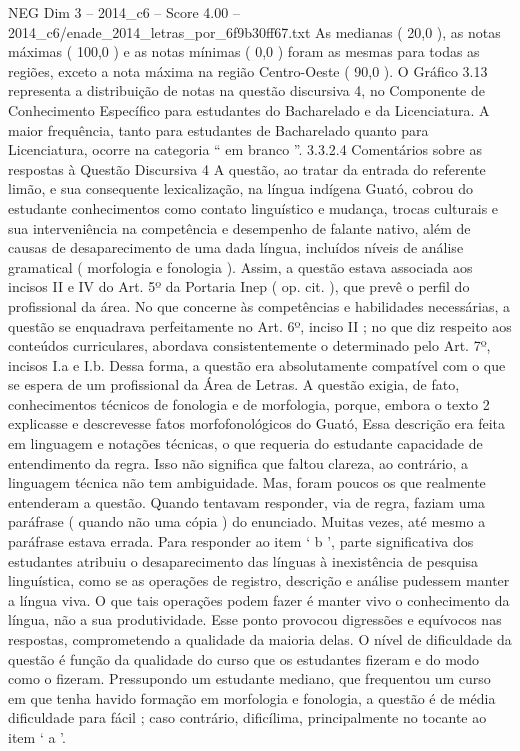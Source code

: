 \begin{textsample}{NEG Dim 3 – 2014\_c6 – Score 4.00 – 2014\_c6/enade\_2014\_letras\_por\_6f9b30ff67.txt}
As medianas ( 20,0 ), as notas máximas ( 100,0 ) e as notas mínimas ( 0,0 ) foram as mesmas para todas as regiões, exceto a nota máxima na região Centro-Oeste ( 90,0 ).
O Gráfico 3.13 representa a distribuição de notas na questão discursiva 4, no Componente de Conhecimento Específico para estudantes do Bacharelado e da Licenciatura.
A maior frequência, tanto para estudantes de Bacharelado quanto para Licenciatura, ocorre na categoria “ em branco ”. 3.3.2.4 Comentários sobre as respostas à Questão Discursiva 4 A questão, ao tratar da entrada do referente limão, e sua consequente lexicalização, na língua indígena Guató, cobrou do estudante conhecimentos como contato linguístico e mudança, trocas culturais e sua interveniência na competência e desempenho de falante nativo, além de causas de desaparecimento de uma dada língua, incluídos níveis de análise gramatical ( morfologia e fonologia ).
Assim, a questão estava associada aos incisos II e IV do Art. 5º da Portaria Inep ( op. cit. ), que prevê o perfil do profissional da área.
No que concerne às competências e habilidades necessárias, a questão se enquadrava perfeitamente no Art. 6º, inciso II ; no que diz respeito aos conteúdos curriculares, abordava consistentemente o determinado pelo Art. 7º, incisos I.a e I.b.
Dessa forma, a questão era absolutamente compatível com o que se espera de um profissional da Área de Letras.
A questão exigia, de fato, conhecimentos técnicos de fonologia e de morfologia, porque, embora o texto 2 explicasse e descrevesse fatos morfofonológicos do Guató, Essa descrição era feita em linguagem e notações técnicas, o que requeria do estudante capacidade de entendimento da regra.
Isso não significa que faltou clareza, ao contrário, a linguagem técnica não tem ambiguidade.
Mas, foram poucos os que realmente entenderam a questão.
Quando tentavam responder, via de regra, faziam uma paráfrase ( quando não uma cópia ) do enunciado.
Muitas vezes, até mesmo a paráfrase estava errada.
Para responder ao item ‘ b ’, parte significativa dos estudantes atribuiu o desaparecimento das línguas à inexistência de pesquisa linguística, como se as operações de registro, descrição e análise pudessem manter a língua viva.
O que tais operações podem fazer é manter vivo o conhecimento da língua, não a sua produtividade.
Esse ponto provocou digressões e equívocos nas respostas, comprometendo a qualidade da maioria delas.
O nível de dificuldade da questão é função da qualidade do curso que os estudantes fizeram e do modo como o fizeram.
Pressupondo um estudante mediano, que frequentou um curso em que tenha havido formação em morfologia e fonologia, a questão é de média dificuldade para fácil ; caso contrário, dificílima, principalmente no tocante ao item ‘ a ’.

\end{textsample}
